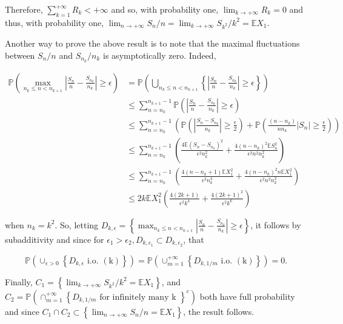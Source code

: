 \documentclass[11pt]{amsbook}
\theoremstyle{plain}%
\theoremstyle{definition}
\theoremstyle{remark}
\begin{document}
Therefore, $\sum_{k=1}^{+\infty} R_{k}<+\infty$ and so, with probability one, $\lim _{k \rightarrow+\infty} R_{k}=0$ and thus, with probability one, $\lim _{n \rightarrow+\infty} S_{n} / n=\lim _{k \rightarrow+\infty} S_{k^{2}} / k^{2}=\mathbb{E} X_{1}$.

Another way to prove the above result is to note that the maximal fluctuations between $S_{n} / n$ and $S_{n_{k}} / n_{k}$ is asymptotically zero. Indeed,

$$
\begin{aligned}
\mathbb{P}\left(\max _{n_{k} \leq n<n_{k+1}}\left|\frac{S_{n}}{n}-\frac{S_{n_{k}}}{n_{k}}\right| \geq \epsilon\right) & =\mathbb{P}\left(\bigcup_{n_{k} \leq n<n_{k+1}}\left\{\left|\frac{S_{n}}{n}-\frac{S_{n_{k}}}{n_{k}}\right| \geq \epsilon\right\}\right) \\
& \leq \sum_{n=n_{k}}^{n_{k+1}-1} \mathbb{P}\left(\left|\frac{S_{n}}{n}-\frac{S_{n_{k}}}{n_{k}}\right| \geq \epsilon\right) \\
& \leq \sum_{n=n_{k}}^{n_{k+1}-1}\left(\mathbb{P}\left(\left|\frac{S_{n}-S_{n_{k}}}{n_{k}}\right| \geq \frac{\epsilon}{2}\right)+\mathbb{P}\left(\frac{\left(n-n_{k}\right)}{n n_{k}}\left|S_{n}\right| \geq \frac{\epsilon}{2}\right)\right) \\
& \leq \sum_{n=n_{k}}^{n_{k+1}-1}\left(\frac{4 \mathbb{E}\left(S_{n}-S_{n_{k}}\right)^{2}}{\epsilon^{2} n_{k}^{2}}+\frac{4\left(n-n_{k}\right)^{2} \mathbb{E} S_{n}^{2}}{\epsilon^{2} n^{2} n_{k}^{2}}\right) \\
& \leq \sum_{n=n_{k}}^{n_{k+1}-1}\left(\frac{4\left(n-n_{k}+1\right) \mathbb{E} X_{1}^{2}}{\epsilon^{2} n_{k}^{4}}+\frac{4\left(n-n_{k}\right)^{2} n \mathbb{E} X_{1}^{2}}{\epsilon^{2} n^{2} n_{k}^{2}}\right) \\
& \leq 2 k \mathbb{E} X_{1}^{2}\left(\frac{4(2 k+1)}{\epsilon^{2} k^{4}}+\frac{4(2 k+1)^{2}}{\epsilon^{2} k^{6}}\right)
\end{aligned}
$$

when $n_{k}=k^{2}$. So, letting $D_{k, \epsilon}=\left\{\max _{n_{k} \leq n<n_{k+1}}\left|\frac{S_{n}}{n}-\frac{S_{n_{k}}}{n_{k}}\right| \geq \epsilon\right\}$, it follows by subadditivity and since for $\epsilon_{1}>\epsilon_{2}, D_{k, \epsilon_{1}} \subset D_{k, \epsilon_{2}}$, that

$$
\mathbb{P}\left(\cup_{\epsilon>0}\left\{D_{k, \epsilon} \text { i.o. }(\mathrm{k})\right\}\right)=\mathbb{P}\left(\cup_{m=1}^{+\infty}\left\{D_{k, 1 / m} \text { i.o. }(\mathrm{k})\right\}\right)=0 \text {. }
$$

Finally, $C_{1}=\left\{\lim _{k \rightarrow+\infty} S_{k^{2}} / k^{2}=\mathbb{E} X_{1}\right\}$, and $C_{2}=\mathbb{P}\left(\cap_{m=1}^{+\infty}\left\{D_{k, 1 / m} \text { for infinitely many k }\right\}^{c}\right)$ both have full probability and since $C_{1} \cap C_{2} \subset\left\{\lim _{n \rightarrow+\infty} S_{n} / n=\mathbb{E} X_{1}\right\}$, the result follows.
\end{document}
